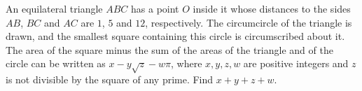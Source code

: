 An equilateral triangle $ABC$ has a point $O$ inside it whose distances to the sides $AB$, $BC$ and $AC$ are $1$, $5$ and $12$, respectively. The circumcircle of the triangle is drawn, and the smallest square containing this circle is circumscribed about it. The area of the square minus the sum of the areas of the triangle and of the circle can be written as $x-y\sqrt z-w\pi$, where $x,y,z,w$ are positive integers and $z$ is not divisible by the square of any prime. Find $x+y+z+w$.
